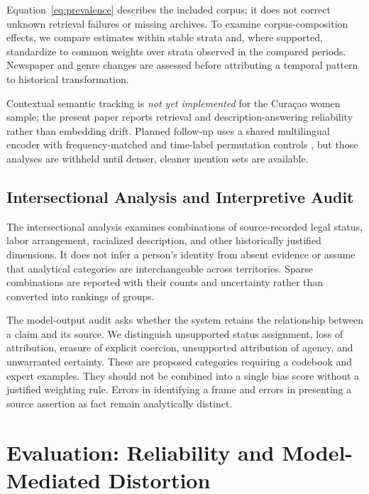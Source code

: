 \documentclass[sigconf]{acmart}
\begin{document}
Equation~\eqref{eq:prevalence} describes the included corpus; it does not correct unknown retrieval failures or missing archives. To examine corpus-composition effects, we compare estimates within stable strata and, where supported, standardize to common weights over strata observed in the compared periods. Newspaper and genre changes are assessed before attributing a temporal pattern to historical transformation.

Contextual semantic tracking is \emph{not yet implemented} for the Cura\c{c}ao women sample; the present paper reports retrieval and description-answering reliability rather than embedding drift. Planned follow-up uses a shared multilingual encoder with frequency-matched and time-label permutation controls \citep{dubossarsky2017outta}, but those analyses are withheld until denser, cleaner mention sets are available.

\subsection{Intersectional Analysis and Interpretive Audit}

The intersectional analysis examines combinations of source-recorded legal status, labor arrangement, racialized description, and other historically justified dimensions. It does not infer a person's identity from absent evidence or assume that analytical categories are interchangeable across territories. Sparse combinations are reported with their counts and uncertainty rather than converted into rankings of groups.

The model-output audit asks whether the system retains the relationship between a claim and its source. We distinguish unsupported status assignment, loss of attribution, erasure of explicit coercion, unsupported attribution of agency, and unwarranted certainty. These are proposed categories requiring a codebook and expert examples. They should not be combined into a single bias score without a justified weighting rule. Errors in identifying a frame and errors in presenting a source assertion as fact remain analytically distinct.

\section{Evaluation: Reliability and Model-Mediated Distortion}
\label{sec:evaluation}
\end{document}
